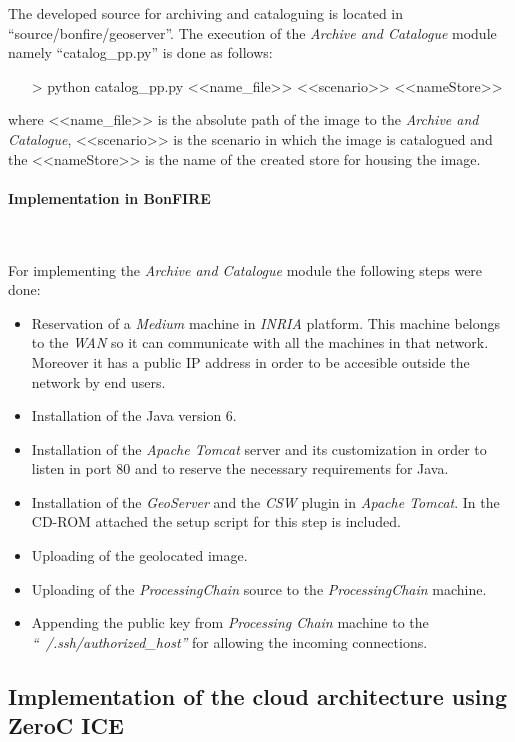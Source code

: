 The developed source for archiving and cataloguing is located in
``source/bonfire/geoserver''. The execution of the \emph{Archive and Catalogue}
module namely ``catalog\_pp.py'' is done as follows:
\begin{itemize}
\item[>] python catalog\_pp.py <<name\_file>> <<scenario>> <<nameStore>>
\end{itemize}
where <<name\_file>> is the absolute path of the image to the \emph{Archive and Catalogue},
<<scenario>> is the scenario in which the image is catalogued and the
<<nameStore>> is the name of the created store for housing the image.

\paragraph{Implementation in BonFIRE}~\\
\label{para:bonfire-impl-cat}


For implementing the \emph{Archive and Catalogue} module the following steps were done:

\begin{itemize}
 \item Reservation of a \emph{Medium} machine in \emph{INRIA} \bonfire
   platform. This machine belongs to the \bonfire \emph{WAN} so it can communicate
   with all the machines in that network. Moreover it has a public \ac{IP} address
   in order to be accesible outside the \bonfire network by end users. 
 \item Installation of the Java version 6.
 \item Installation of the \emph{Apache Tomcat} server and its customization in
   order to listen in port 80 and to reserve the necessary requirements for Java.
 \item Installation of the \emph{GeoServer} and the \emph{CSW} plugin in
   \emph{Apache Tomcat}. In the CD-ROM attached the setup script for this step
   is included.
 \item Uploading of the geolocated image.
 \item Uploading of the \emph{ProcessingChain} source to the \emph{ProcessingChain}
   machine.
 \item Appending the public key from \emph{Processing Chain} machine to the
   \emph{``~/.ssh/authorized\_host''} for
   allowing the incoming connections.
\end{itemize}


\subsection{Implementation of the cloud architecture using ZeroC ICE}

